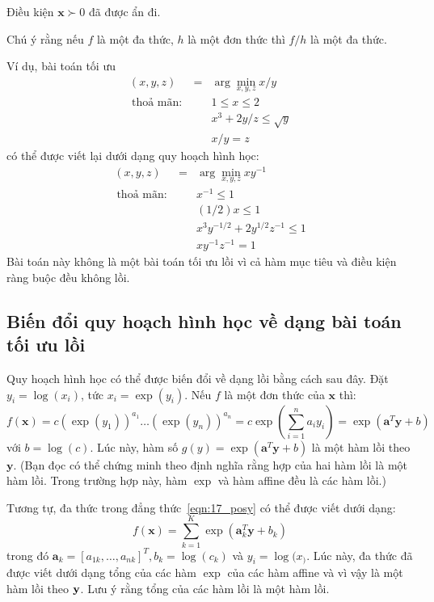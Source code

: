 Điều kiện $\mathbf{x} \succ 0$ đã được ẩn đi.

Chú ý rằng nếu $f$ là một đa thức, $h$ là một đơn thức thì $f/h$ là một đa thức.

Ví dụ, bài toán tối ưu
\begin{eqnarray}
\nonumber
(x, y, z)    &=& \arg\min_{x, y, z} x/y                          \\\
\text{thoả mãn:}~ && 1 \leq x \leq 2 \\\
\nonumber
&& x^3 + 2y/z \leq \sqrt{y} \\\
\nonumber
&& x/y = z
\end{eqnarray}
có thể được viết lại dưới dạng quy hoạch hình học:
\begin{eqnarray}
\nonumber
(x, y, z)    &=& \arg\min_{x, y, z} xy ^{-1}                        \\\
\text{thoả mãn:}~ && x^{-1} \leq 1 \\\
\nonumber
&& (1/2)x \leq 1 \\\
\nonumber
&& x^3y^{-1/2} + 2y^{1/2}z^{-1} \leq 1 \\\
\nonumber
&& xy^{-1}z^{-1} = 1
\end{eqnarray}
Bài toán này không là một bài toán tối ưu lồi vì cả hàm mục tiêu và điều kiện ràng buộc đều không lồi.


\subsection{Biến đổi quy hoạch hình học về dạng bài toán tối ưu lồi}
Quy hoạch hình học có thể được biến đổi về dạng lồi bằng cách sau đây. Đặt $y_i = \log(x_i)$,
tức $x_i = \exp({y_i})$. Nếu $f$ là một đơn thức của
$\mathbf{x}$ thì:
\begin{equation*}
f(\mathbf{x}) = c(\exp({y_1}))^{a_1} \dots (\exp({y_n}))^{a_n} =
c\exp\left(\sum_{i=1}^n a_iy_i\right) = \exp({\mathbf{a}^T\mathbf{y} + b})
\end{equation*}
với $b = \log(c)$. Lúc này, hàm số $g(y) = \exp({\mathbf{a}^T\mathbf{y} + b})$ là một hàm lồi theo $\mathbf{y}$. (Bạn đọc có thể chứng minh theo định nghĩa rằng hợp của hai hàm lồi là một hàm lồi. Trong trường hợp này, hàm $\exp$ và hàm {affine} đều là các hàm lồi.)

Tương tự, đa thức trong đẳng thức~\eqref{eqn:17_posy} có thể
được viết dưới dạng:
\begin{equation*}
f(\mathbf{x}) = \sum_{k = 1}^K \exp(\mathbf{a}_k^T\mathbf{y} + b_k)
\end{equation*}
trong đó $\mathbf{a}_k = [a_{1k}, \dots, a_{nk}]^T, b_k = \log(c_k)$ và $y_i =
\log(x_)$. Lúc này, đa thức đã được viết dưới dạng tổng của các hàm
$\exp$ của các hàm {affine} và vì vậy là một hàm lồi theo $\mathbf{y}$. Lưu ý rằng tổng của các hàm lồi là một hàm lồi.

